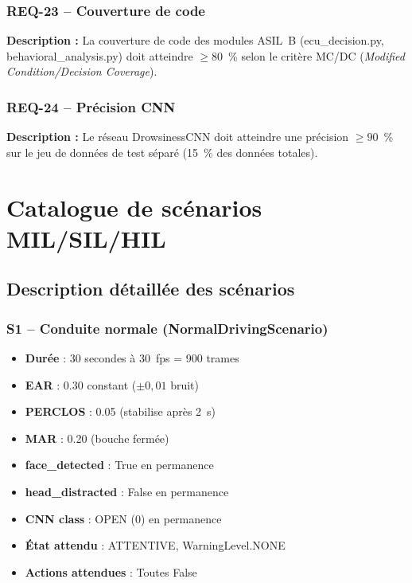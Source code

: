 \documentclass[12pt,a4paper]{report}
\begin{document}
\subsection*{REQ-23 -- Couverture de code}
\textbf{Description :} La couverture de code des modules ASIL~B (ecu\_decision.py, behavioral\_analysis.py) doit atteindre $\geq 80$~\% selon le crit\`ere MC/DC (\textit{Modified Condition/Decision Coverage}).

\subsection*{REQ-24 -- Pr\'ecision CNN}
\textbf{Description :} Le r\'eseau DrowsinessCNN doit atteindre une pr\'ecision $\geq 90$~\% sur le jeu de donn\'ees de test s\'epar\'e (15~\% des donn\'ees totales).

\clearpage

\chapter{Catalogue de sc\'enarios MIL/SIL/HIL}

\section{Description d\'etaill\'ee des sc\'enarios}

\subsection{S1 -- Conduite normale (NormalDrivingScenario)}

\begin{itemize}
  \item \textbf{Dur\'ee} : 30 secondes \`a 30~fps = 900 trames
  \item \textbf{EAR} : 0.30 constant ($\pm 0{,}01$ bruit)
  \item \textbf{PERCLOS} : 0.05 (stabilise apr\`es 2~s)
  \item \textbf{MAR} : 0.20 (bouche ferm\'ee)
  \item \textbf{face\_detected} : True en permanence
  \item \textbf{head\_distracted} : False en permanence
  \item \textbf{CNN class} : OPEN (0) en permanence
  \item \textbf{\'Etat attendu} : ATTENTIVE, WarningLevel.NONE
  \item \textbf{Actions attendues} : Toutes False
\end{itemize}
\end{document}
